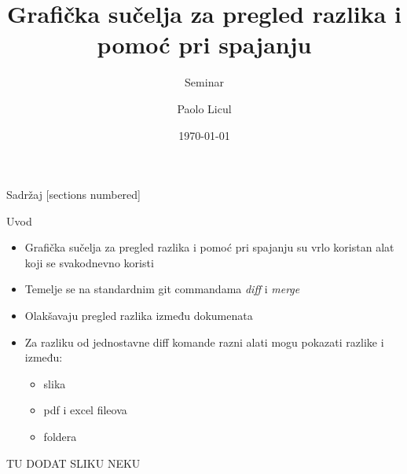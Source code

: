\documentclass[10pt]{beamer}
\title{Grafička sučelja za pregled razlika i pomoć pri spajanju}
\subtitle{Seminar}
\date{\today}
\author{Paolo Licul}{Nino Dumičić}
\begin{document}
\maketitle

\begin{frame}{Sadržaj}
  [sections numbered]
  \tableofcontents[hideallsubsections]
\end{frame}


\begin{frame}{Uvod}
	\begin{itemize}
		\item Grafička sučelja za pregled razlika i pomoć pri spajanju su vrlo koristan alat koji se svakodnevno koristi
		\item Temelje se na standardnim git commandama \emph{diff} i \emph{merge}
		\item Olakšavaju pregled razlika između dokumenata
		\item Za razliku od jednostavne diff komande razni alati mogu pokazati razlike i između: \begin{itemize}
		\item slika
		\item pdf i excel fileova
		\item foldera
		\end{itemize}
	\end{itemize} 
	
	TU DODAT SLIKU NEKU
\end{frame}
\end{document}
